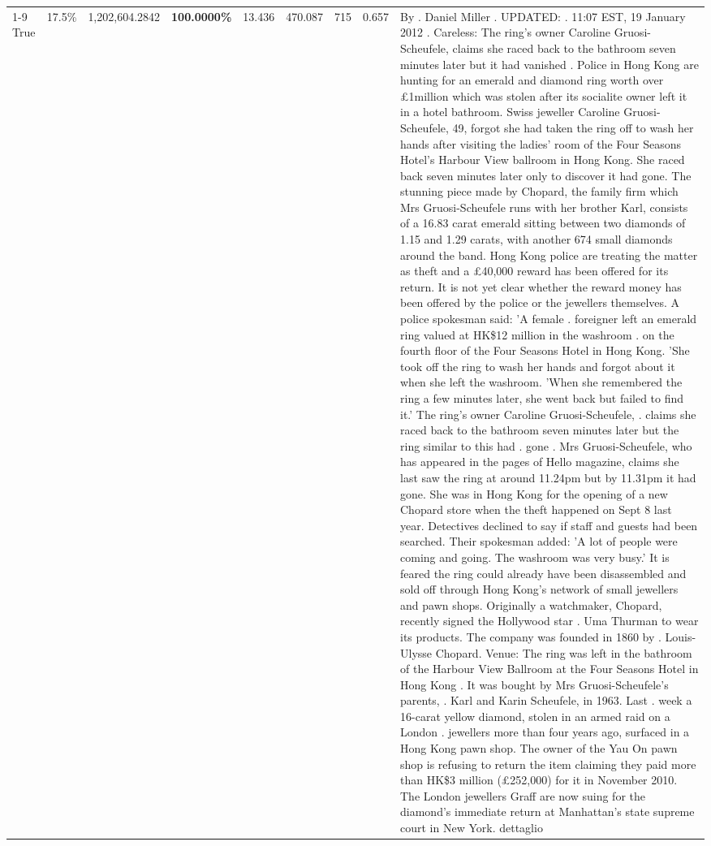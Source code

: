\begin{table}[H]
\begin{tabular}{lllrlllll}
\cline{1-9}
True & 17.5\% & 1,202,604.2842 & \bfseries \color{red} 100.0000\% & 13.436 & 470.087 & 715 & 0.657 & By . Daniel Miller . UPDATED: . 11:07 EST, 19 January 2012 . Careless: The ring's owner Caroline Gruosi-Scheufele, claims she raced back to the bathroom seven minutes later but it had vanished . Police in Hong Kong are hunting for an emerald and diamond ring worth over £1million which was stolen after its socialite owner left it in a hotel bathroom. Swiss jeweller Caroline Gruosi-Scheufele, 49, forgot she had taken the ring off to wash her hands after visiting the ladies' room of the Four Seasons Hotel's Harbour View ballroom in Hong Kong. She raced back seven minutes later only to discover it had gone. The stunning piece made by Chopard, the family firm which Mrs Gruosi-Scheufele runs with her brother Karl, consists of a 16.83 carat emerald sitting between two diamonds of 1.15 and 1.29 carats, with another 674 small diamonds around the band. Hong Kong police are treating the matter as theft and a £40,000 reward has been offered for its return. It is not yet clear whether the reward money has been offered by the police or the jewellers themselves. A police spokesman said: 'A female . foreigner left an emerald ring valued at HK\$12 million in the washroom . on the fourth floor of the Four Seasons Hotel in Hong Kong. 'She took off the ring to wash her hands and forgot about it when she left the washroom. 'When she remembered the ring a few minutes later, she went back but failed to find it.' The ring's owner Caroline Gruosi-Scheufele, . claims she raced back to the bathroom seven minutes later but the ring similar to this had . gone . Mrs Gruosi-Scheufele, who has appeared in the pages of Hello magazine, claims she last saw the ring at around 11.24pm but by 11.31pm it had gone. She was in Hong Kong for the opening of a new Chopard store when the theft happened on Sept 8 last year. Detectives declined to say if staff and guests had been searched. Their spokesman added: 'A lot of people were coming and going. The washroom was very busy.' It is feared the ring could already have been disassembled and sold off through Hong Kong's network of small jewellers and pawn shops. Originally a watchmaker, Chopard, recently signed the Hollywood star . Uma Thurman to wear its products. The company was founded in 1860 by . Louis-Ulysse Chopard. Venue: The ring was left in the bathroom of the Harbour View Ballroom at the Four Seasons Hotel in Hong Kong . It was bought by Mrs Gruosi-Scheufele's  parents, . Karl and Karin Scheufele, in 1963. Last . week a 16-carat yellow diamond, stolen in an armed raid on a London . jewellers more than four years ago, surfaced in a Hong Kong pawn shop. The owner of the Yau On pawn shop is refusing to return the item claiming they paid more than HK\$3 million (£252,000) for it in November 2010. The London jewellers Graff are now suing for the diamond’s immediate return at Manhattan’s state supreme court in New York. dettaglio \\

\end{tabular}
\end{table}

